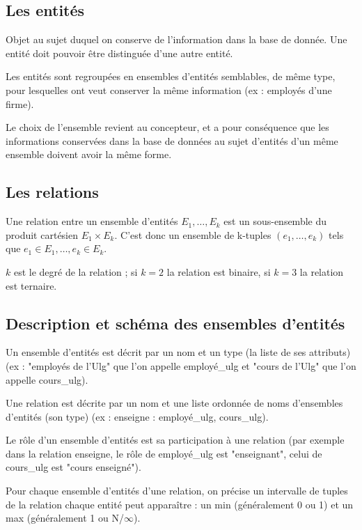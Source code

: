 		\subsection{Les entités}
		
		Objet au sujet duquel on conserve de l'information dans la base de donnée. Une entité doit pouvoir être distinguée d'une autre entité.
		
		Les entités sont regroupées en ensembles d'entités semblables, de même type, pour lesquelles ont veut conserver la même information (ex : employés d'une firme).
		
		Le choix de l'ensemble revient au concepteur, et a pour conséquence que les informations conservées dans la base de données au sujet d'entités d'un même ensemble doivent avoir la même forme.
		
		\subsection{Les relations}
		
		Une relation entre un ensemble d'entités $E_1, \dots , E_k$ est un sous-ensemble du produit cartésien $E_1 \times E_k$. C'est donc un ensemble de k-tuples $(e_1, \dots,  e_k)$ tels que $e_1 \in E_1, \dots , e_k \in E_k$.
		
		$k$ est le degré de la relation ; si $k = 2$ la relation est binaire, si $k = 3$ la relation est ternaire.
		
		\subsection{Description et schéma des ensembles d'entités}
		
		Un ensemble d'entités est décrit par un nom et un type (la liste de ses attributs) (ex : "employés de l'Ulg" que l'on appelle employé\_ulg et "cours de l'Ulg" que l'on appelle cours\_ulg).
		
		Une relation est décrite par un nom et une liste ordonnée de noms d'ensembles d'entités (son type) (ex : enseigne : employé\_ulg, cours\_ulg).
		
		Le rôle d'un ensemble d'entités est sa participation à une relation (par exemple dans la relation enseigne, le rôle de employé\_ulg est "enseignant", celui de cours\_ulg est "cours enseigné").
		
		Pour chaque ensemble d'entités d'une relation, on précise un intervalle de tuples de la relation chaque entité peut apparaître : un min (généralement 0 ou 1) et un max (généralement 1 ou N/$\infty$).
		
